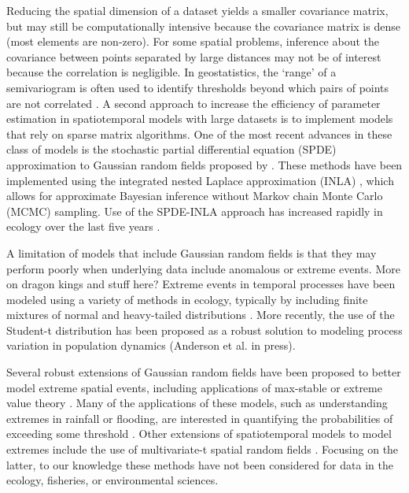 \documentclass[12pt,english]{article}
\begin{document}
\begin{spacing}{1.05}
Reducing the spatial dimension of a dataset yields a smaller covariance matrix,
but may still be computationally intensive because the covariance matrix is
dense (most elements are non-zero). For some spatial problems, inference about
the covariance between points separated by large distances may not be of
interest because the correlation is negligible. In geostatistics, the `range'
of a semivariogram is often used to identify thresholds beyond which pairs of
points are not correlated \citep{rossi1992}. A second approach to increase the
efficiency of parameter estimation in spatiotemporal models with large datasets
is to implement models that rely on sparse matrix algorithms. One of the most
recent advances in these class of models is the stochastic partial differential
equation (SPDE) approximation to Gaussian random fields proposed by
\citet{lindgren2011}. These methods have been implemented using the integrated
nested Laplace approximation (INLA) \citep{rue2009}, which allows for
approximate Bayesian inference without Markov chain Monte Carlo (MCMC)
sampling. Use of the SPDE-INLA approach has increased rapidly in ecology over
the last five years \citep[e.g.][]{illian2013, ono2016}.

A limitation of models that include Gaussian random fields is that they may
perform poorly when underlying data include anomalous or extreme events. More
on dragon kings and stuff here? Extreme events in temporal processes have been
modeled using a variety of methods in ecology, typically by including finite
mixtures of normal and
heavy-tailed distributions \citep{everitt1996, ward2007, thorson2011}.
More recently, the use of the Student-t distribution
has been proposed as a robust solution to modeling process variation in
population dynamics (Anderson et al. in press).

Several robust extensions of Gaussian random fields have been proposed to
better model extreme spatial events, including applications of max-stable or
extreme value theory \citep{davison2012, davison2012a}. Many of the
applications of these models, such as understanding extremes in rainfall or
flooding, are interested in quantifying the probabilities of exceeding some
threshold \citep{davis2008}. Other extensions of spatiotemporal models to model
extremes include the use of multivariate-t spatial random fields
\citep{roislien2007}. Focusing on the latter, to our knowledge these methods
have not been considered for data in the ecology, fisheries, or environmental
sciences.


\end{spacing}
\end{document}
